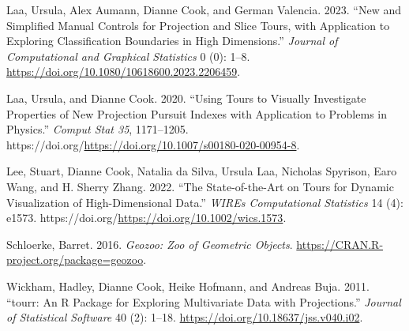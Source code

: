 \begin{CSLReferences}{1}{0}
\leavevmode{}%
Laa, Ursula, Alex Aumann, Dianne Cook, and German Valencia. 2023. {``New and Simplified Manual Controls for Projection and Slice Tours, with Application to Exploring Classification Boundaries in High Dimensions.''} \emph{Journal of Computational and Graphical Statistics} 0 (0): 1--8. \url{https://doi.org/10.1080/10618600.2023.2206459}.

\leavevmode{}%
Laa, Ursula, and Dianne Cook. 2020. {``Using Tours to Visually Investigate Properties of New Projection Pursuit Indexes with Application to Problems in Physics.''} \emph{Comput Stat 35}, 1171--1205. https://doi.org/\url{https://doi.org/10.1007/s00180-020-00954-8}.

\leavevmode{}%
Lee, Stuart, Dianne Cook, Natalia da Silva, Ursula Laa, Nicholas Spyrison, Earo Wang, and H. Sherry Zhang. 2022. {``The State-of-the-Art on Tours for Dynamic Visualization of High-Dimensional Data.''} \emph{WIREs Computational Statistics} 14 (4): e1573. https://doi.org/\url{https://doi.org/10.1002/wics.1573}.

\leavevmode{}%
Schloerke, Barret. 2016. \emph{Geozoo: Zoo of Geometric Objects}. \url{https://CRAN.R-project.org/package=geozoo}.

\leavevmode{}%
Wickham, Hadley, Dianne Cook, Heike Hofmann, and Andreas Buja. 2011. {``{tourr}: An {R} Package for Exploring Multivariate Data with Projections.''} \emph{Journal of Statistical Software} 40 (2): 1--18. \url{https://doi.org/10.18637/jss.v040.i02}.

\end{CSLReferences}



\address{%
Zoljargal Batsaikhan\\
Monash University\\%
Department of Econometrics and Business Statistics\\ Clayton, VIC, Australia\\
%
\url{https://github.com/zolabat}\\%
\textit{ORCiD: \href{https://orcid.org/0009-0005-0055-1448}{0009-0005-0055-1448}}\\%
\href{mailto:zoljargal11@gmail.com}{\nolinkurl{zoljargal11@gmail.com}}%
}

\address{%
Dianne Cook\\
Monash University\\%
Department of Econometrics and Business Statistics\\ Clayton, VIC, Australia\\
%
\url{http://www.dicook.org}\\%
\textit{ORCiD: \href{https://orcid.org/0000-0002-3813-7155}{0000-0002-3813-7155}}\\%
\href{mailto:dicook@monash.edu}{\nolinkurl{dicook@monash.edu}}%
}


